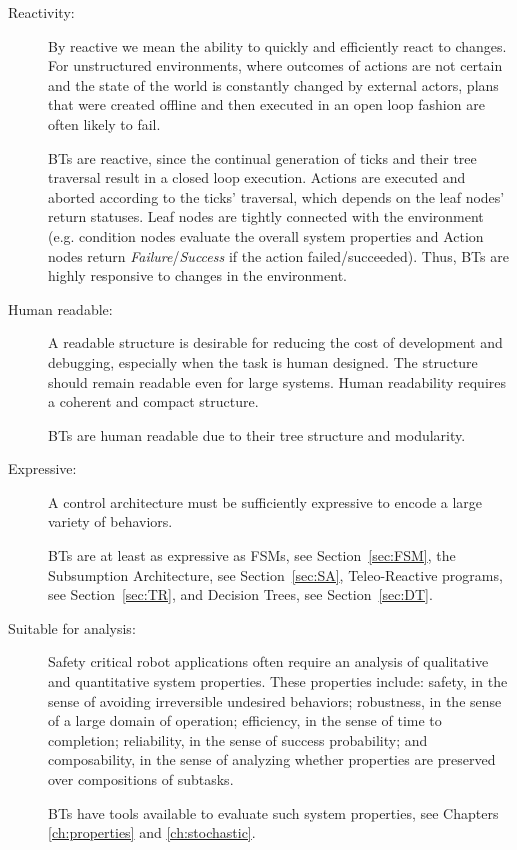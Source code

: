 \begin{description}
\item[Reactivity:] By reactive we mean the ability to quickly and efficiently react to changes.
 For unstructured environments, where outcomes of actions are not certain and the state of the world is constantly changed by external actors,
 plans that were created offline and then executed in an open loop fashion are often likely to fail.

BTs are reactive, since
the continual generation of ticks and their tree traversal result in a closed loop execution. Actions are executed and aborted according to the ticks' traversal, which depends on the leaf nodes' return statuses. Leaf nodes are tightly connected with the environment (e.g. condition nodes evaluate the overall system properties and Action nodes return  \emph{Failure}/\emph{Success} if the action failed/succeeded). 
Thus, BTs are highly responsive to changes in the environment.



\item[Human readable:] A readable structure is desirable for reducing the cost of development and debugging, especially when the task is human designed. The structure should remain readable even for large systems. Human readability requires a coherent and compact structure.

BTs are human readable due to their tree structure and modularity.

\item[Expressive:] A control architecture must be sufficiently expressive to encode a large variety of behaviors.

BTs are at least as expressive as FSMs, see Section~\ref{sec:FSM}, the Subsumption Architecture, see Section~\ref{sec:SA}, Teleo-Reactive programs, see Section~\ref{sec:TR}, and Decision Trees, see Section~\ref{sec:DT}.


\item[Suitable for analysis:] Safety critical robot applications often require an analysis of qualitative and quantitative system properties. These properties include: safety, in the sense of avoiding irreversible undesired behaviors;  robustness, in the sense of a large domain of operation; efficiency, in the sense of time to completion; reliability, in the sense of success probability; and composability, in the sense of analyzing whether properties are preserved over compositions of subtasks. 

BTs have tools available to evaluate such system properties, see Chapters \ref{ch:properties} and \ref{ch:stochastic}.


\end{description}
